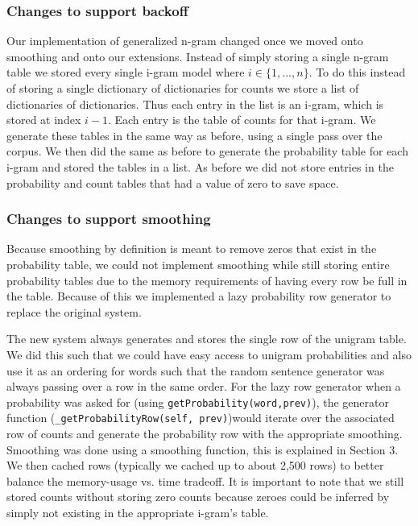 \documentclass{article}
\begin{document}
\subsubsection{Changes to support backoff}
Our implementation of generalized n-gram changed once we moved onto smoothing and onto our extensions. Instead of simply storing a single n-gram table we stored every single i-gram model where $i\in \lbrace 1,...,n \rbrace$. To do this instead of storing a single dictionary of dictionaries for counts we store a list of dictionaries of dictionaries. Thus each entry in the list is an i-gram, which is stored at index $i-1$. Each entry is the table of counts for that i-gram. We generate these tables in the same way as before, using a single pass over the corpus. We then did the same as before to generate the probability table for each i-gram and stored the tables in a list. As before we did not store entries in the probability and count tables that had a value of zero to save space.

\subsubsection{Changes to support smoothing}
Because smoothing by definition is meant to remove zeros that exist in the probability table, we could not implement smoothing while still storing entire probability tables due to the memory requirements of having every row be full in the table. Because of this we implemented a lazy probability row generator to replace the original system.

The new system always generates and stores the single row of the unigram table. We did this such that we could have easy access to unigram probabilities and also use it as an ordering for words such that the random sentence generator was always passing over a row in the same order. For the lazy row generator when a probability was asked for (using \texttt{getProbability(word,prev)}), the generator function (\texttt{\_getProbabilityRow(self, prev)})would iterate over the associated row of counts and generate the probability row with the appropriate smoothing. Smoothing was done using a smoothing function, this is explained in Section 3. We then cached rows (typically we cached up to about 2,500 rows) to better balance the memory-usage vs. time tradeoff. It is important to note that we still stored counts without storing zero counts because zeroes could be inferred by simply not existing in the appropriate i-gram's table.
\end{document}
